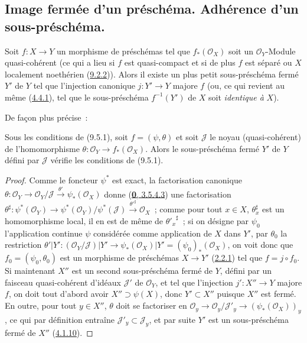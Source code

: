 \subsection{Image fermée d'un préschéma. Adhérence d'un sous-préschéma.}
\label{subsection:I.9.5-fr}

\begin{proposition}[9.5.1]
\label{I.9.5.1-fr}
Soit $f:X\to Y$ un morphisme de préschémas tel que $f_*(\mathscr{O}_X)$ soit
un $\mathscr{O}_Y$-Module quasi-cohérent (ce qui a lieu si $f$ est
quasi-compact et si de plus $f$ est séparé ou $X$ localement noethérien
(\hyperref[I.9.2.2-fr]{9.2.2})). Alors il existe un plus petit sous-préschéma fermé
$Y'$ de $Y$ tel que l'injection canonique $j:Y'\to Y$ majore $f$ \textup{(ou, ce qui
revient au même (\hyperref[I.4.4.1-fr]{4.4.1}), tel que le sous-préschéma
$f^{-1}(Y')$ de $X$ soit \emph{identique à} $X$)}.
\end{proposition}

De façon plus précise~:

\begin{corollary}[9.5.2]
\label{I.9.5.2-fr}
Sous les conditions de (9.5.1), soit $f=(\psi,\theta)$ et soit $\mathscr{J}$
le noyau (quasi-cohérent) de l'homomorphisme
$\theta:\mathscr{O}_Y\to f_*(\mathscr{O}_X)$. Alors le sous-préschéma fermé
$Y'$ de $Y$ défini par $\mathscr{J}$ vérifie les conditions de (9.5.1).
\end{corollary}

\begin{proof}
Comme le foncteur $\psi^*$ est exact, la factorisation canonique
$\theta:\mathscr{O}_Y\to\mathscr{O}_Y/\mathscr{J}
\xrightarrow{\theta'}\psi_*(\mathscr{O}_X)$ donne
(\hyperref[0.3.5.4.3-fr]{\textbf{0}, 3.5.4.3}) une factorisation
$\theta^\sharp:\psi^*(\mathscr{O}_Y)
\to\psi^*(\mathscr{O}_Y)/\psi^*(\mathscr{J})
\xrightarrow{{\theta'}^\sharp}\mathscr{O}_X$~;
comme pour tout $x\in X$, $\theta_x^\sharp$ est un homomorphisme local, il
en est de même de ${\theta'_x}^\sharp$~; si on désigne par $\psi_0$
l'application continue $\psi$ considérée comme application de $X$ dans
$Y'$, par $\theta_0$ la restriction
$\theta'|Y':(\mathscr{O}_Y/\mathscr{J})|Y'
\to\psi_*(\mathscr{O}_X)|Y'=(\psi_0)_*(\mathscr{O}_X)$, on voit donc que
$f_0=(\psi_0,\theta_0)$ est un morphisme de préschémas $X\to Y'$
(\hyperref[I.2.2.1-fr]{2.2.1}) tel que $f=j\circ f_0$. Si maintenant $X''$
est un second sous-préschéma fermé de $Y$, défini par un faisceau
quasi-cohérent d'idéaux $\mathscr{J}'$ de $\mathscr{O}_Y$, et tel que
l'injection $j':X''\to Y$ majore $f$, on doit tout d'abord avoir
$X''\supset\psi(X)$, donc $Y'\subset X''$ puisque $X''$ est fermé. En outre,
pour tout $y\in X''$, $\theta$ doit se factoriser en
$\mathscr{O}_y\to\mathscr{O}_y/\mathscr{J}'_y
\to(\psi_*(\mathscr{O}_X))_y$, ce qui par définition entraîne
$\mathscr{J}'_y\subset\mathscr{J}_y$, et par suite $Y'$ est un
sous-préschéma fermé de $X''$ (\hyperref[I.4.1.10-fr]{4.1.10}).
\end{proof}

